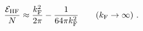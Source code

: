 \begin{equation}
\frac{{\cal E}_{\rm HF}}{N} \approx  \frac{k_{\rm F}^2}{2\pi} - \frac{1}{64 \pi k_{\rm F}^2} \qquad (k_{\rm F}\to \infty)\ . 
\label{t13i}
\end{equation}


